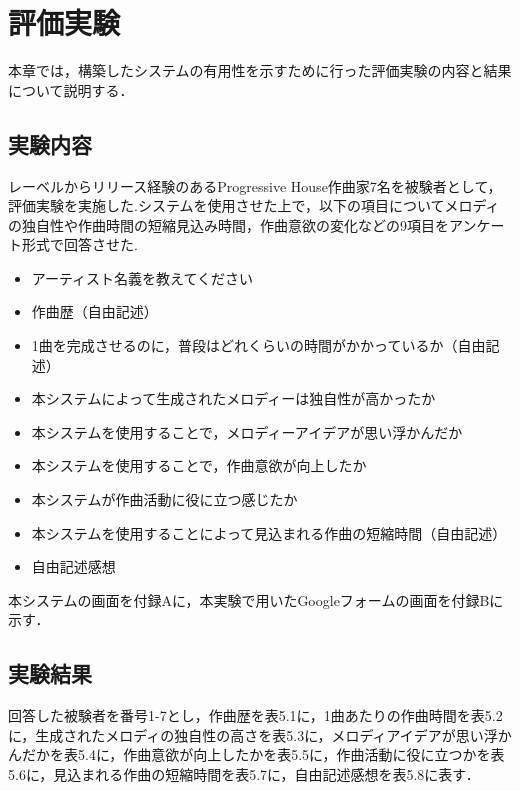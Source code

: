\chapter{評価実験}
本章では，構築したシステムの有用性を示すために行った評価実験の内容と結果について説明する．

\section{実験内容}
レーベルからリリース経験のあるProgressive House作曲家7名を被験者として，評価実験を実施した.システムを使用させた上で，以下の項目についてメロディの独自性や作曲時間の短縮見込み時間，作曲意欲の変化などの9項目をアンケート形式で回答させた.
\begin{itemize}
  \item アーティスト名義を教えてください
  \item 作曲歴（自由記述）
  \item 1曲を完成させるのに，普段はどれくらいの時間がかかっているか（自由記述）
  \item 本システムによって生成されたメロディーは独自性が高かったか
  \item 本システムを使用することで，メロディーアイデアが思い浮かんだか
  \item 本システムを使用することで，作曲意欲が向上したか
  \item 本システムが作曲活動に役に立つ感じたか
  \item 本システムを使用することによって見込まれる作曲の短縮時間（自由記述）
  \item 自由記述感想
\end{itemize}
本システムの画面を付録Aに，本実験で用いたGoogleフォームの画面を付録Bに示す．

\section{実験結果}
回答した被験者を番号1-7とし，作曲歴を表5.1に，1曲あたりの作曲時間を表5.2に，生成されたメロディの独自性の高さを表5.3に，メロディアイデアが思い浮かんだかを表5.4に，作曲意欲が向上したかを表5.5に，作曲活動に役に立つかを表5.6に，見込まれる作曲の短縮時間を表5.7に，自由記述感想を表5.8に表す．

